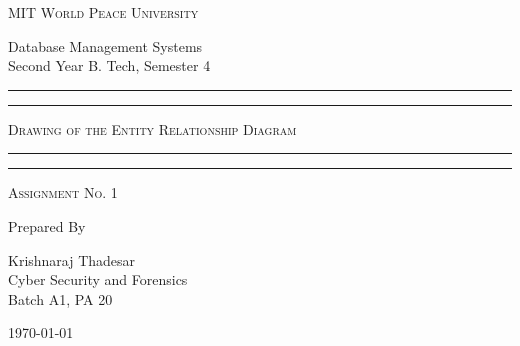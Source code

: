 \documentclass[11pt]{article}
\begin{document}
\begin{titlepage}
	\centering


	\huge\textsc{
		MIT World Peace University
	}\\

	\vspace{0.75\baselineskip} %

	\LARGE{
		Database Management Systems\\
		Second Year B. Tech, Semester 4
	}

	\vfill %


	\rule{\textwidth}{1.6pt}\vspace*{-\baselineskip}\vspace*{2pt}
	\rule{\textwidth}{0.6pt}
	\vspace{0.75\baselineskip} %



	\huge{\textsc{
			Drawing of the Entity Relationship Diagram
		}} \\



	\vspace{0.5\baselineskip} %
	\rule{\textwidth}{0.6pt}\vspace*{-\baselineskip}\vspace*{2.8pt}
	\rule{\textwidth}{1.6pt}

	\vspace{1\baselineskip} %


	\LARGE\textsc{
		Assignment No. 1
	} %
	\vfill


	Prepared By
	\vspace{0.5\baselineskip} %

	\Large{
		Krishnaraj Thadesar \\
		Cyber Security and Forensics\\
		Batch A1, PA 20
	}


	\vspace{0.5\baselineskip} %
	\today

\end{titlepage}
\end{document}
